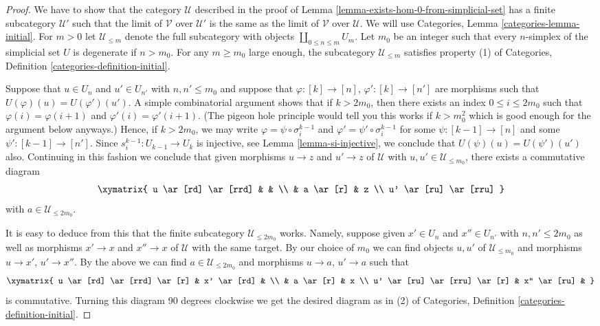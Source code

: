 \begin{proof}
We have to show that the category $\mathcal{U}$ described
in the proof of Lemma \ref{lemma-exists-hom-0-from-simplicial-set}
has a finite subcategory $\mathcal{U}'$ such that the limit
of $\mathcal{V}$ over $\mathcal{U}'$ is the same as the
limit of $\mathcal{V}$ over $\mathcal{U}$. We will use
Categories, Lemma \ref{categories-lemma-initial}.
For $m > 0$ let $\mathcal{U}_{\leq m}$ denote the full
subcategory with objects $\coprod_{0 \leq n \leq m} U_m$.
Let $m_0$ be an integer such that every $n$-simplex
of the simplicial set $U$ is degenerate if $n > m_0$.
For any $m \geq m_0$ large enough, the subcategory
$\mathcal{U}_{\leq m}$ satisfies property (1) of
Categories, Definition \ref{categories-definition-initial}.

\medskip\noindent
Suppose that $u \in U_n$ and
$u' \in U_{n'}$ with $n, n' \leq m_0$ and suppose that
$\varphi : [k] \to [n]$, $\varphi' : [k] \to [n']$
are morphisms such that $U(\varphi)(u) = U(\varphi')(u')$.
A simple combinatorial argument shows that if $k > 2m_0$,
then there exists an index $0 \leq i \leq 2m_0$ such that
$\varphi(i) =\varphi(i + 1)$ and $\varphi'(i) = \varphi'(i + 1)$.
(The pigeon hole principle would tell you this works if
$k > m_0^2$ which is good enough for the argument below
anyways.) Hence, if $k > 2m_0$, we may write
$\varphi = \psi \circ \sigma^{k - 1}_i$ and
$\varphi' = \psi' \circ \sigma^{k - 1}_i$ for some
$\psi : [k - 1] \to [n]$ and some $\psi' : [k - 1] \to [n']$.
Since $s^{k - 1}_i : U_{k - 1} \to U_k$ is injective,
see Lemma \ref{lemma-si-injective}, we conclude that
$U(\psi)(u) = U(\psi')(u')$ also. Continuing in this
fashion we conclude that given morphisms
$u \to z$ and $u' \to z$ of $\mathcal{U}$
with $u, u' \in \mathcal{U}_{\leq m_0}$, there exists
a commutative diagram
$$
\xymatrix{
u \ar[rd] \ar[rrd] & & \\
& a \ar[r] & z \\
u' \ar[ru] \ar[rru]
}
$$
with $a \in \mathcal{U}_{\leq 2m_0}$.

\medskip\noindent
It is easy to deduce from this that the finite subcategory
$\mathcal{U}_{\leq 2m_0}$ works. Namely, suppose given
$x' \in U_n$ and $x'' \in U_{n'}$ with $n, n' \leq 2m_0$ as well as
morphisms $x' \to x$ and $x'' \to x$ of $\mathcal{U}$
with the same target. By our choice of $m_0$ we can
find objects $u, u'$ of $\mathcal{U}_{\leq m_0}$ and
morphisms $u \to x'$, $u' \to x''$.
By the above we can find $a \in \mathcal{U}_{\leq 2m_0}$
and morphisms $u \to a$, $u' \to a$ such that
$$
\xymatrix{
u \ar[rd] \ar[rrd] \ar[r] & x' \ar[rd] & \\
& a \ar[r] & x \\
u' \ar[ru] \ar[rru] \ar[r] & x'' \ar[ru] &
}
$$
is commutative. Turning this diagram 90 degrees clockwise
we get the desired diagram as in (2) of
Categories, Definition \ref{categories-definition-initial}.
\end{proof}

